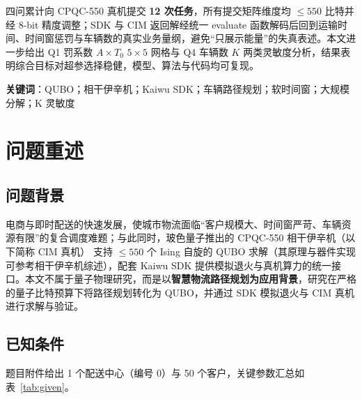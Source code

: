 \documentclass[UTF8,12pt,a4paper]{ctexart}
\begin{document}
四问累计向 CPQC-550 真机提交 \textbf{12 次任务}，所有提交矩阵维度均 $\le 550$ 比特并经 8-bit 精度调整；SDK 与 CIM 返回解经统一 evaluate 函数解码后回到运输时间、时间窗惩罚与车辆数的真实业务量纲，避免``只展示能量''的失真表述。本文进一步给出 Q1 罚系数 $A\!\times\!T_0$ $5\!\times\!5$ 网格与 Q4 车辆数 $K$ 两类灵敏度分析，结果表明综合目标对超参选择稳健，模型、算法与代码均可复现。

\vspace{0.6em}
\noindent\textbf{关键词}：QUBO；相干伊辛机；Kaiwu SDK；车辆路径规划；软时间窗；大规模分解；K 灵敏度

\newpage

\section{问题重述}

\subsection{问题背景}

电商与即时配送的快速发展，使城市物流面临``客户规模大、时间窗严苛、车辆资源有限''的复合调度难题；与此同时，玻色量子推出的 CPQC-550 相干伊辛机（以下简称 CIM 真机）\cite{boson2024cpqc} 支持 $\le 550$ 个 Ising 自旋的 QUBO 求解（其原理与器件实现可参考相干伊辛机综述\cite{yamamoto2017cim,honjo2021cim2000}），配套 Kaiwu SDK\cite{kaiwusdk2024} 提供模拟退火与真机算力的统一接口。本文不属于量子物理研究，而是以\textbf{智慧物流路径规划为应用背景}，研究在严格的量子比特预算下将路径规划转化为 QUBO，并通过 SDK 模拟退火与 CIM 真机进行求解与验证。

\subsection{已知条件}

题目附件给出 1 个配送中心（编号 0）与 50 个客户，关键参数汇总如表~\ref{tab:given}。
\end{document}

